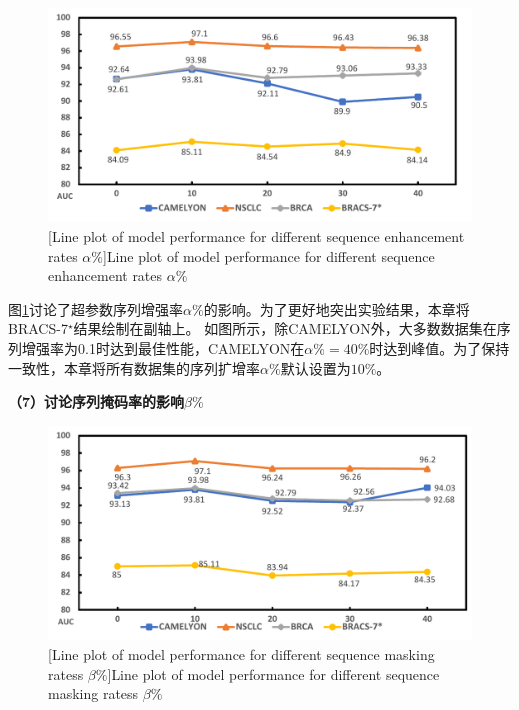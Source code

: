 \begin{figure}[h!]
  \centering
  \includegraphics[width=0.8\columnwidth]{figures/MixRatio.pdf}
  [Line plot of model performance for different sequence enhancement rates \texorpdfstring{$\alpha\%$}{}]{Line plot of model performance for different sequence enhancement rates \texorpdfstring{$\alpha\%$}{}}
  \label{figure4: mixratio}
\end{figure}

图\ref{figure4: mixratio}讨论了超参数序列增强率$\alpha\%$的影响。为了更好地突出实验结果，本章将BRACS-7$^\star$结果绘制在副轴上。
如图所示，除CAMELYON外，大多数数据集在序列增强率为0.1时达到最佳性能，CAMELYON在$\alpha\%=40\%$时达到峰值。为了保持一致性，本章将所有数据集的序列扩增率$\alpha\%$默认设置为$10\%$。


\textbf{（7）讨论序列掩码率的影响\texorpdfstring{$\beta\%$}{}}

\begin{figure}[h!]
  \centering
  \includegraphics[width=0.8\columnwidth]{figures/MaskRatio.pdf}
  [Line plot of model performance for different sequence masking ratess \texorpdfstring{$\beta\%$}{}]{Line plot of model performance for different sequence masking ratess \texorpdfstring{$\beta\%$}{}}
  \label{figure4: maskratio}
\end{figure}

